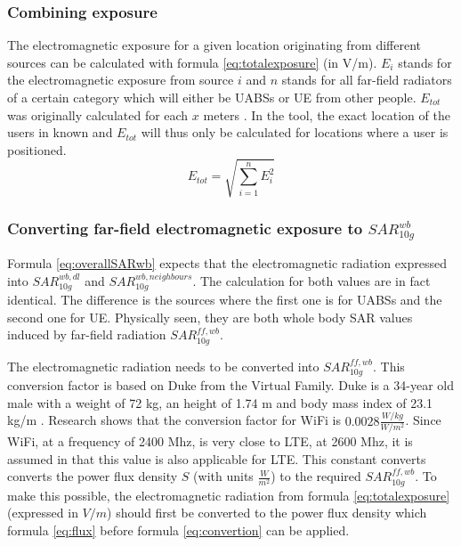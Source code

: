 \subsubsection{Combining exposure}
The electromagnetic exposure for a given location originating from different sources can be calculated with formula \ref{eq:totalexposure} (in V/m). $E_i$ stands for 
the electromagnetic exposure from source $i$ and
$n$ stands for all far-field radiators of a certain category which will either be \gls{UABS}s or \gls{UE} from other people.
$E_{tot}$ was originally calculated for each $x$ meters \cite{J1}. In the tool, the exact location of the users in known and $E_{tot}$ will thus 
only be calculated for locations where a user is positioned.
\begin{equation}
E_{tot} = \sqrt{\sum_{i=1}^{n} E_i^2}
\label{eq:totalexposure}
\end{equation}

\subsubsection{Converting far-field electromagnetic exposure to $SAR^{wb}_{10g}$}
\label{sub:convertDLtosarwb}

Formula \ref{eq:overallSARwb} expects that the electromagnetic radiation expressed into $SAR^{wb,dl}_{10g}$ and $SAR^{wb,neighbours}_{10g}$. The 
calculation for both values are in fact identical. The difference is the sources where the first one is for \gls{UABS}s and the second one for \gls{UE}.
Physically seen, they are both whole body SAR values induced by far-field radiation $SAR^{ff,wb}_{10g}$.

The electromagnetic radiation needs to be converted into $SAR^{ff,wb}_{10g}$. 
This conversion factor is based on Duke from the Virtual Family. Duke is a 34-year old male with  a weight of 72 kg, an height of 1.74 m and body
mass index of 23.1 kg/m \cite{J22_plets2015joint}. Research shows that the conversion factor for WiFi is $0.0028 \frac{W/kg}{W/m^2}$.
 Since WiFi, at a frequency of 2400 Mhz,
is very close to LTE, at 2600 Mhz, it is assumed in \cite{J22_plets2015joint} that this value is also applicable for \gls{LTE}.
This constant converts converts the \gls{power flux density} $S$ (with units $\frac{W}{m^2}$) to the required $SAR^{ff,wb}_{10g}$.
To make this possible, the electromagnetic radiation
from formula \ref{eq:totalexposure} (expressed in  $V/m$) should first be converted to the  \gls{power flux density} which formula 
\ref{eq:flux} before formula \ref{eq:convertion} can be applied.

